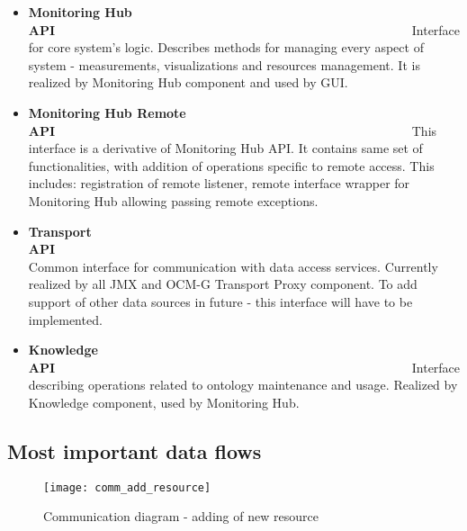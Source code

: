 \begin{itemize}
 \item {\bf Monitoring Hub API}~~~~~~~~~~~~~~~~~~~~~~~~~~~~~~~~~~~~~~~~~~~~~~~~~~~~~~~~\linebreak
Interface for core system's logic. Describes methods for managing every aspect of system - measurements, visualizations
and resources management. It is realized by Monitoring Hub component and used by GUI. 

 \item {\bf Monitoring Hub Remote API}~~~~~~~~~~~~~~~~~~~~~~~~~~~~~~~~~~~~~~~~~~~~~~~~~~~~~~~~\linebreak
This interface is a derivative of Monitoring Hub API. It contains same set of functionalities, with addition
of operations specific to remote access. This includes: registration of remote listener, remote
interface wrapper for Monitoring Hub allowing passing remote exceptions.

 \item {\bf Transport API}~~~~~~~~~~~~~~~~~~~~~~~~~~~~~~~~~~~~~~~~~~~~~~~~~~~~~~~~\linebreak
Common interface for communication with data access services. Currently realized by all JMX and OCM-G Transport Proxy
component. To add support of other data sources in future - this interface will have to be implemented.

 \item {\bf Knowledge API}~~~~~~~~~~~~~~~~~~~~~~~~~~~~~~~~~~~~~~~~~~~~~~~~~~~~~~~~\linebreak
Interface describing operations related to ontology maintenance and usage. Realized by Knowledge component, used
by Monitoring Hub. 
\end{itemize}



\subsection{Most important data flows}

\begin{figure}[ht]
  \centering
  \texttt{[image: comm\_add\_resource]}
  \caption{Communication diagram - adding of new resource}
  \label{fig:comm_add_resource}
\end{figure}

